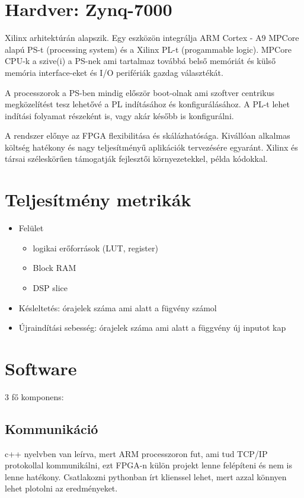 \documentclass{article}
\begin{document}
\section{Hardver: Zynq-7000}
\cite{Hardware} \cite{Hardware2}
Xilinx arhitektúrán alapszik. Egy eszközön integrálja ARM Cortex - A9 MPCore  alapú PS-t (processing system) és a Xilinx PL-t (progammable logic).
MPCore CPU-k a szive(i) a PS-nek ami tartalmaz továbbá belső memóriát és külső memória interface-eket és I/O perifériák gazdag választékát.

A processzorok a PS-ben mindig először boot-olnak ami szoftver centrikus megközelítést tesz lehetővé a PL indításához és konfigurálásához. A PL-t lehet indítási folyamat részeként is, vagy akár később is konfigurálni. 

A rendszer előnye az FPGA flexibilitása és skálázhatósága. Kivállóan alkalmas költség hatékony és nagy teljesítményű aplikációk tervezésére egyaránt. Xilinx és társai széleskörűen támogatják fejlesztői környezetekkel, példa kódokkal.

\section{Teljesítmény metrikák}
\cite{hls}
\begin{itemize}
    \item Felület
    
    \begin{itemize}
        \item logikai erőforrások (LUT, register)
        \item Block RAM
        \item DSP slice
    \end{itemize}
    
    \item Késleltetés: órajelek száma ami alatt a fügvény számol
    \item Újraindítási sebesség: órajelek száma ami alatt a függvény új inputot kap
\end{itemize}

\section{Software}
3 fő komponens:

\subsection{Kommunikáció}
c++ nyelvben van leírva, mert ARM processzoron fut, ami tud TCP/IP protokollal kommunikálni, ezt FPGA-n külön projekt lenne felépíteni és nem is lenne hatékony. Csatlakozni pythonban írt klienssel lehet, mert azzal könnyen lehet plotolni az eredményeket.
\end{document}
